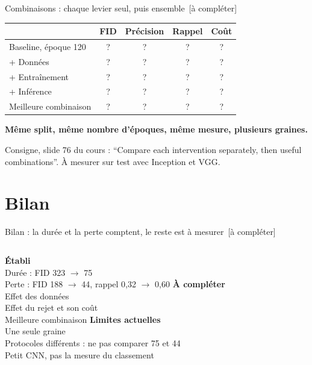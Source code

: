 \documentclass[aspectratio=169,11pt]{beamer}
\newcommand{\source}[1]{\vfill{\scriptsize\color{muted}#1\par}}
\newcommand{\afaire}{{\color{warm}\normalsize\ [à compléter]}}
\begin{document}
\begin{frame}{Combinaisons : chaque levier seul, puis ensemble\afaire}
  \centering\vspace{0.8em}
  \begin{tabular}{lcccc}
    \toprule
    & FID & Précision & Rappel & Coût \\
    \midrule
    Baseline, époque 120 & \color{warm}? & \color{warm}? & \color{warm}? & \color{warm}? \\
    + Données & \color{warm}? & \color{warm}? & \color{warm}? & \color{warm}? \\
    + Entraînement & \color{warm}? & \color{warm}? & \color{warm}? & \color{warm}? \\
    + Inférence & \color{warm}? & \color{warm}? & \color{warm}? & \color{warm}? \\
    Meilleure combinaison & \color{warm}? & \color{warm}? & \color{warm}? & \color{warm}? \\
    \bottomrule
  \end{tabular}

  \vspace{1em}
  {\small \textbf{Même split, même nombre d'époques, même mesure, plusieurs graines.}}
  \source{Consigne, slide 76 du cours : ``Compare each intervention separately, then useful combinations''. À mesurer sur test avec Inception et VGG.}
\end{frame}

\section{Bilan}

\begin{frame}{Bilan : la durée et la perte comptent, le reste est à mesurer\afaire}
  \vspace{0.5em}
  \begin{columns}[T,onlytextwidth]
    \textbf{\color{accent}Établi}\\[0.5em]\small
    Durée : FID 323 $\to$ 75\\[0.4em]
    Perte : FID 188 $\to$ 44, rappel 0,32 $\to$ 0,60
    \textbf{\color{warm}À compléter}\\[0.5em]\small
    Effet des données\\[0.4em]
    Effet du rejet et son coût\\[0.4em]
    Meilleure combinaison
    \textbf{Limites actuelles}\\[0.5em]\small
    Une seule graine\\[0.4em]
    Protocoles différents : ne pas comparer 75 et 44\\[0.4em]
    Petit CNN, pas la mesure du classement
  \end{columns}
\end{frame}
\end{document}

